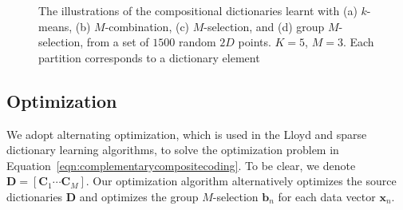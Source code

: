 \documentclass[10pt, letterpaper]{article}
\begin{document}
\begin{figure}[t]
\centering
{}
\vspace{-0.2cm}
\caption{The illustrations of the compositional dictionaries
learnt with (a) $k$-means,
(b) $M$-combination,
(c) $M$-selection,
and (d) group $M$-selection,
from a set of $1500$ random $2D$ points.
$K=5$, $M=3$.
Each partition corresponds to a dictionary element}
\label{fig:spatialpartitiondifferentselectionschemes}\vspace{-0.5cm}
\end{figure}

\subsection{Optimization}
We adopt alternating optimization,
which is used in the Lloyd and sparse dictionary learning algorithms,
to solve the optimization problem in Equation~\ref{eqn:complementarycompositecoding}.
To be clear, we denote $\mathbf{D} = [\mathbf{C}_1\cdots\mathbf{C}_M]$.
Our optimization algorithm alternatively optimizes
the source dictionaries $\mathbf{D}$
and optimizes the group $M$-selection $\mathbf{b}_n$ for each data vector $\mathbf{x}_n$.
\end{document}

